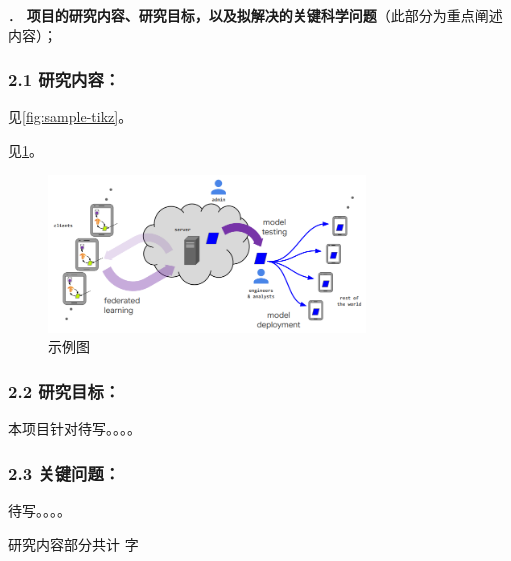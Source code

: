 {\sihao \color{MsBlue} ． {\bfseries 项目的研究内容、研究目标，以及拟解决的关键科学问题}（此部分为重点阐述内容）；}

\subsubsection{\bfseries 2.1 研究内容：}




见\cref{fig:sample-tikz}。



见\cref{fig:sample-fig}。

\begin{figure}[!htp]
\centering
\includegraphics[width=0.75\textwidth]{figures/sample-fig.png}
\caption{示例图}
\label{fig:sample-fig}
\end{figure}


\subsubsection{\bfseries 2.2 研究目标：}

本项目针对待写。。。。


\subsubsection{\bfseries 2.3 关键问题：}

待写。。。。


\ifhandout
\else
\begin{center}
{\larger[2]\color{red}  研究内容部分共计 \wordcount 字 }
\end{center}
\fi


\vskip 5mm
